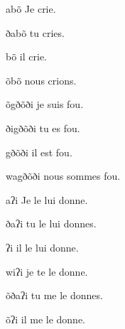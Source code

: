 \documentclass[oldfontcommands,twoside,a4paper,12pt]{article}
\begin{document}
\begin{multicols}{3}
\begin{exe}
\ex \label{ex:aboN}
\glt abõ 
\glt Je crie.
\end{exe} 

\begin{exe}
\ex 
\glt ðabõ 
\glt tu cries.
\end{exe} 
 
 \begin{exe}
\ex 
\glt bõ 
\glt il crie.
\end{exe} 
 
  \begin{exe}
\ex 
\glt õbõ 
\glt nous crions.
\end{exe} 

  \begin{exe}
\ex 
\glt õgðõði
\glt je suis fou.
\end{exe} 

  \begin{exe}
\ex 
\glt ðigðõði
\glt tu es fou.
\end{exe} 

  \begin{exe}
\ex 
\glt gðõði
\glt il est fou.
\end{exe} 

  \begin{exe}
\ex 
\glt wagðõði
\glt nous sommes fou.
\end{exe} 

\begin{exe}
\ex 
\glt aʔi
\glt Je le lui donne.
\end{exe} 

\begin{exe}
\ex 
\glt ðaʔi
\glt tu le lui donnes.
\end{exe} 
 
 \begin{exe}
\ex 
\glt ʔi
\glt il le lui donne.
\end{exe} 

 \begin{exe}
\ex 
\glt wiʔi
\glt je te le donne.
\end{exe} 

 \begin{exe}
\ex 
\glt õðaʔi
\glt tu me le donnes.
\end{exe} 

 \begin{exe}
\ex 
\glt õʔi
\glt il me le donne.
\end{exe} 


\end{multicols}
\end{document}
